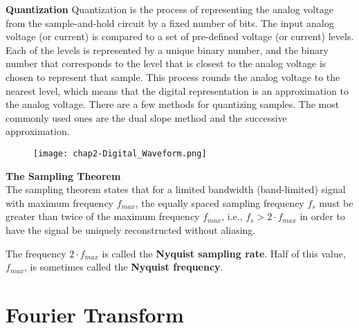\begin{compactitem}
\item \textbf{Quantization}
Quantization is the process of representing the analog voltage from the sample-and-hold
circuit by a fixed number of bits. The input analog voltage (or current) is compared to
a set of pre-defined voltage (or current) levels. Each of the levels is represented
by a unique binary number, and the binary number that corresponds to the level that is
closest to the analog voltage is chosen to represent that sample. This process rounds
the analog voltage to the nearest level, which means that the digital representation
is an approximation to the analog voltage. There are a few methods for quantizing samples.
The most commonly used ones are the dual slope method and the successive approximation.

\begin{figure}[ht]
  \centering
    \texttt{[image: chap2-Digital\_Waveform.png]}
  \caption{}
  \label{fig:chap2-Digital_Waveform}
\end{figure}


\item \textbf{The Sampling Theorem}\cite{dsp-nyquist}\\
The sampling theorem states that for a limited bandwidth (band-limited) signal with maximum frequency $f_{max}$,
the equally spaced sampling frequency $f_s$ must be greater than twice of the maximum frequency $f_{max}$, i.e.,
$f_s > 2·f_{max}$
in order to have the signal be uniquely reconstructed without aliasing.

The frequency $2·f_{max}$ is called the \textbf{Nyquist sampling rate}. Half of this value, $f_{max}$,
is sometimes called the \textbf{Nyquist frequency}.

\end{compactitem}

\section{Fourier Transform} \cite{csulb-Woollett}

